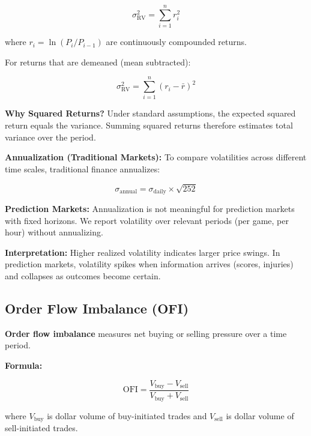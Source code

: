 \begin{equation}
\sigma_{\text{RV}}^2 = \sum_{i=1}^{n} r_i^2
\end{equation}

where $r_i = \ln(P_i / P_{i-1})$ are continuously compounded returns.

For returns that are demeaned (mean subtracted):

\begin{equation}
\sigma_{\text{RV}}^2 = \sum_{i=1}^{n} (r_i - \bar{r})^2
\end{equation}

\textbf{Why Squared Returns?} Under standard assumptions, the expected squared return equals the variance. Summing squared returns therefore estimates total variance over the period.

\textbf{Annualization (Traditional Markets):} To compare volatilities across different time scales, traditional finance annualizes:

\begin{equation}
\sigma_{\text{annual}} = \sigma_{\text{daily}} \times \sqrt{252}
\end{equation}

\textbf{Prediction Markets:} Annualization is not meaningful for prediction markets with fixed horizons. We report volatility over relevant periods (per game, per hour) without annualizing.

\textbf{Interpretation:} Higher realized volatility indicates larger price swings. In prediction markets, volatility spikes when information arrives (scores, injuries) and collapses as outcomes become certain.

\subsection{Order Flow Imbalance (OFI)}
\label{method:ofi-appendix}

\textbf{Order flow imbalance} measures net buying or selling pressure over a time period.

\textbf{Formula:}

\begin{equation}
\text{OFI} = \frac{V_{\text{buy}} - V_{\text{sell}}}{V_{\text{buy}} + V_{\text{sell}}}
\end{equation}

where $V_{\text{buy}}$ is dollar volume of buy-initiated trades and $V_{\text{sell}}$ is dollar volume of sell-initiated trades.

